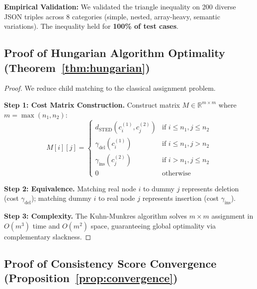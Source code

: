 \documentclass{article}
\begin{document}
\textbf{Empirical Validation:} We validated the triangle inequality on 200 diverse JSON triples across 8 categories (simple, nested, array-heavy, semantic variations). The inequality held for \textbf{100\% of test cases}.

\subsection{Proof of Hungarian Algorithm Optimality (Theorem~\ref{thm:hungarian})}

\begin{proof}
We reduce child matching to the classical assignment problem.

\textbf{Step 1: Cost Matrix Construction.}
Construct matrix $M \in \mathbb{R}^{m \times m}$ where $m = \max(n_1, n_2)$:
\begin{equation}
    M[i][j] = \begin{cases}
        d_{\text{STED}}(c_i^{(1)}, c_j^{(2)}) & \text{if } i \leq n_1, j \leq n_2 \\
        \gamma_{\text{del}}(c_i^{(1)}) & \text{if } i \leq n_1, j > n_2 \\
        \gamma_{\text{ins}}(c_j^{(2)}) & \text{if } i > n_1, j \leq n_2 \\
        0 & \text{otherwise}
    \end{cases}
\end{equation}

\textbf{Step 2: Equivalence.} Matching real node $i$ to dummy $j$ represents deletion (cost $\gamma_{\text{del}}$); matching dummy $i$ to real node $j$ represents insertion (cost $\gamma_{\text{ins}}$).

\textbf{Step 3: Complexity.} The Kuhn-Munkres algorithm solves $m \times m$ assignment in $O(m^3)$ time and $O(m^2)$ space, guaranteeing global optimality via complementary slackness.
\end{proof}

\subsection{Proof of Consistency Score Convergence (Proposition~\ref{prop:convergence})}
\end{document}
